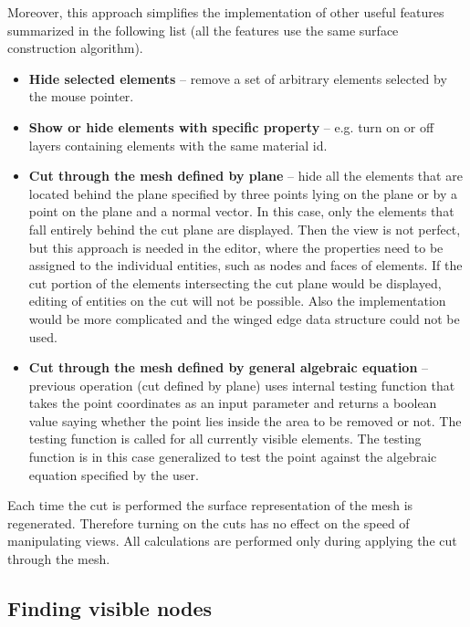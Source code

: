 Moreover, this approach simplifies the implementation of other useful features summarized in the following list (all the features use the same surface construction algorithm).

\begin{itemize}
	\item \textbf{Hide selected elements} -- remove a set of arbitrary elements selected by the mouse pointer.
	\item \textbf{Show or hide elements with specific property} -- e.g. turn on or off layers containing elements with the same material id.
	\item \textbf{Cut through the mesh defined by plane} -- hide all the elements that are located behind the plane specified by three points lying on the plane or by a point on the plane and a normal vector. In this case, only the elements that fall entirely behind the cut plane are displayed. Then the view is not perfect, but this approach is needed in the editor, where the properties need to be assigned to the individual entities, such as nodes and faces of elements. If the cut portion of the elements intersecting the cut plane would be displayed, editing of entities on the cut will not be possible. Also the implementation would be more complicated and the winged edge data structure could not be used.
	\item \textbf{Cut through the mesh defined by general algebraic equation} -- previous operation (cut defined by plane) uses internal testing function that takes the point coordinates as an input parameter and returns a boolean value saying whether the point lies inside the area to be removed or not. The testing function is called for all currently visible elements. The testing function is in this case generalized to test the point against the algebraic equation specified by the user.
\end{itemize}

Each time the cut is performed the surface representation of the mesh is regenerated. Therefore turning on the cuts has no effect on the speed of manipulating views. All calculations are performed only during applying the cut through the mesh.


\subsection{Finding visible nodes}

